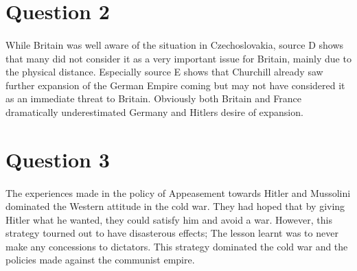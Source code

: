 \documentclass[11pt]{article}
\begin{document}
\section{Question 2}
\paragraph{}
While Britain was well aware of the situation in Czechoslovakia, source D shows that many did not consider it as a very important issue for Britain, mainly due to the physical distance. Especially source E shows that Churchill already saw further expansion of the German Empire coming but may not have considered it as an immediate threat to Britain. Obviously both Britain and France dramatically underestimated Germany and Hitlers desire of expansion.

\section{Question 3}
\paragraph{}
The experiences made in the policy of Appeasement towards Hitler and Mussolini dominated the Western attitude in the cold war. They had hoped that by giving Hitler what he wanted, they could satisfy him and avoid a war. However, this strategy tourned out to have disasterous effects; The lesson learnt was to never make any concessions to dictators. This strategy dominated the cold war and the policies made against the communist empire.
\end{document}
